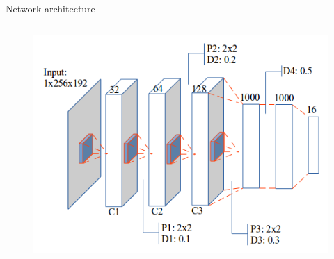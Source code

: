 \documentclass[10pt]{beamer}
\begin{document}
\begin{frame}{Network architecture}{}
\begin{columns}
\begin{column}{0.6\textwidth}
{\begin{center}
\begin{figure}[htbp]
				\end{figure}
     		\end{center}
     		}
     		{
     		\begin{center}
     			\begin{figure}[htbp]
        			\centering
        			\includegraphics[scale=.405]{images/architecture3}
    				\label{figrsexample1}
				\end{figure}
     		\end{center}
     		}
		\end{column}
	\end{columns}~\\
\end{frame}
\end{document}
